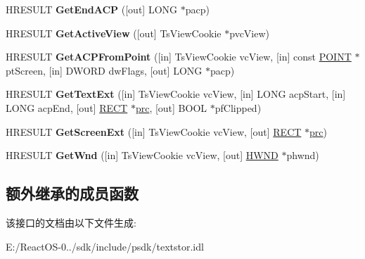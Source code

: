 \begin{DoxyCompactItemize}
H\+R\+E\+S\+U\+LT {\bfseries Get\+End\+A\+CP} (\mbox{[}out\mbox{]} L\+O\+NG $\ast$pacp)
\item 
\mbox{\label{interface_i_text_store_a_c_p_a6701b38d98bdd23e0f16101002a00cba}} 
H\+R\+E\+S\+U\+LT {\bfseries Get\+Active\+View} (\mbox{[}out\mbox{]} Ts\+View\+Cookie $\ast$pvc\+View)
\item 
\mbox{\label{interface_i_text_store_a_c_p_a6d754647aff07e6cde9109a8ed135d46}} 
H\+R\+E\+S\+U\+LT {\bfseries Get\+A\+C\+P\+From\+Point} (\mbox{[}in\mbox{]} Ts\+View\+Cookie vc\+View, \mbox{[}in\mbox{]} const \hyperlink{structtag_p_o_i_n_t}{P\+O\+I\+NT} $\ast$pt\+Screen, \mbox{[}in\mbox{]} D\+W\+O\+RD dw\+Flags, \mbox{[}out\mbox{]} L\+O\+NG $\ast$pacp)
\item 
\mbox{\label{interface_i_text_store_a_c_p_ad88472e5f1ebf8a3db37452318408ac3}} 
H\+R\+E\+S\+U\+LT {\bfseries Get\+Text\+Ext} (\mbox{[}in\mbox{]} Ts\+View\+Cookie vc\+View, \mbox{[}in\mbox{]} L\+O\+NG acp\+Start, \mbox{[}in\mbox{]} L\+O\+NG acp\+End, \mbox{[}out\mbox{]} \hyperlink{structtag_r_e_c_t}{R\+E\+CT} $\ast$\hyperlink{structtag_r_e_c_t}{prc}, \mbox{[}out\mbox{]} B\+O\+OL $\ast$pf\+Clipped)
\item 
\mbox{\label{interface_i_text_store_a_c_p_a9b40169eb764ffbab2003f341a40b7b1}} 
H\+R\+E\+S\+U\+LT {\bfseries Get\+Screen\+Ext} (\mbox{[}in\mbox{]} Ts\+View\+Cookie vc\+View, \mbox{[}out\mbox{]} \hyperlink{structtag_r_e_c_t}{R\+E\+CT} $\ast$\hyperlink{structtag_r_e_c_t}{prc})
\item 
\mbox{\label{interface_i_text_store_a_c_p_acd621e515bf4dc80263b1b477023cc51}} 
H\+R\+E\+S\+U\+LT {\bfseries Get\+Wnd} (\mbox{[}in\mbox{]} Ts\+View\+Cookie vc\+View, \mbox{[}out\mbox{]} \hyperlink{interfacevoid}{H\+W\+ND} $\ast$phwnd)
\end{DoxyCompactItemize}
\subsection*{额外继承的成员函数}


该接口的文档由以下文件生成\+:\begin{DoxyCompactItemize}
\item 
E\+:/\+React\+O\+S-\/0../sdk/include/psdk/textstor.\+idl\end{DoxyCompactItemize}
